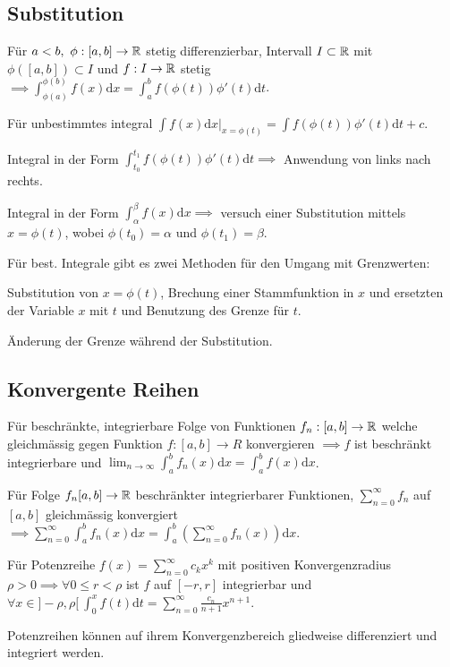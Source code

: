 \subsection{Substitution}
Für $a < b, \ \phi: [a, b] \to \mathbb{R}$ stetig differenzierbar, Intervall $I \subset \mathbb{R}$ mit $\phi([a,b]) \subset I$ und $f: I \to \mathbb{R}$ stetig $\implies \int_{\phi(a)}^{\phi(b)} f(x) \mathrm{d}x = \int_{a}^{b} f(\phi(t)) \phi'(t) \mathrm{d}t$.
\begin{compactitem}
    \item Für unbestimmtes integral $\int f(x) \mathrm{d}x |_{x=\phi(t)} = \int f(\phi(t))\phi'(t) \mathrm{d}t + c$.
    \item Integral in der Form $\int_{t_0}^{t_1} f(\phi(t))\phi'(t)\mathrm{d}t \implies$ Anwendung von links nach rechts.
    \item Integral in der Form $\int_{\alpha}^{\beta} f(x) \mathrm{d}x \implies$ versuch einer Substitution mittels $x = \phi(t)$, wobei $\phi(t_0) = \alpha$ und $\phi(t_1) = \beta$.
    \item Für best. Integrale gibt es zwei Methoden für den Umgang mit Grenzwerten:
        \begin{compactitem}
            \item Substitution von $x=\phi(t)$, Brechung einer Stammfunktion in $x$ und ersetzten der Variable $x$ mit $t$ und Benutzung des Grenze für $t$.
            \item Änderung der Grenze während der Substitution.  \end{compactitem}
\end{compactitem}

\subsection{Konvergente Reihen}
\begin{compactitem}
    \item Für beschränkte, integrierbare Folge von Funktionen $f_n: [a,b] \to \mathbb{R}$ welche gleichmässig gegen Funktion $f:[a,b] \to R$ konvergieren $\implies f$ ist beschränkt integrierbare und $\lim_{n \to \infty} \int_{a}^{b} f_n(x) \mathrm{d}x = \int_{a}^{b} f(x) \mathrm{d}x$.
    \item Für Folge $f_n [a,b] \to \mathbb{R}$ beschränkter integrierbarer Funktionen, $\sum_{n=0}^{\infty} f_n$ auf $[a,b]$ gleichmässig konvergiert $\implies \sum_{n=0}^{\infty} \int_{a}^{b} f_n(x) \mathrm{d}x = \int_{a}^{b} \left( \sum_{n=0}^{\infty} f_n(x) \right) \mathrm{d}x$.
    \item Für Potenzreihe $f(x) = \sum_{n=0}^{\infty} c_kx^k$ mit positiven Konvergenzradius $\rho > 0 \implies \forall 0 \le r < \rho$ ist $f$ auf $[-r, r]$ integrierbar und $\forall x \in ]-\rho, \rho[ \ \int_{0}^{x} f(t) \mathrm{d}t = \sum_{n=0}^{\infty} \frac{c_n}{n + 1} x^{n+1}$.
        \begin{compactitem}
            \item Potenzreihen können auf ihrem Konvergenzbereich gliedweise differenziert und integriert werden.
        \end{compactitem}
\end{compactitem}

